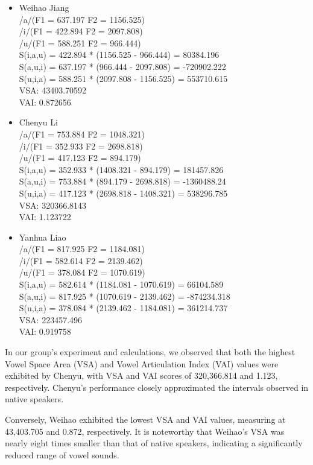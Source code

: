 \documentclass{../labbook}
\begin{document}
\begin{solution}
\begin{itemize}
\item Weihao Jiang\\
/a/(F1 = 637.197 F2 = 1156.525)\\
/i/(F1 = 422.894 F2 = 2097.808)\\
/u/(F1 = 588.251 F2 = 966.444)\\
S(i,a,u) = 422.894 * (1156.525 - 966.444) = 80384.196\\
S(a,u,i) = 637.197 * (966.444 - 2097.808) = -720902.222\\
S(u,i,a) = 588.251 * (2097.808 - 1156.525) = 553710.615\\
VSA: 43403.70592\\
VAI: 0.872656
\item Chenyu Li\\
/a/(F1 = 753.884 F2 = 1048.321)\\
/i/(F1 = 352.933 F2 = 2698.818)\\
/u/(F1 = 417.123 F2 = 894.179)\\
S(i,a,u) = 352.933 * (1408.321 - 894.179) = 181457.826\\
S(a,u,i) = 753.884 * (894.179 - 2698.818) = -1360488.24\\
S(u,i,a) = 417.123 * (2698.818 - 1408.321) = 538296.785\\
VSA: 320366.8143\\
VAI: 1.123722
\item Yanhua Liao\\
/a/(F1 = 817.925 F2 = 1184.081)\\
/i/(F1 = 582.614 F2 = 2139.462)\\
/u/(F1 = 378.084 F2 = 1070.619)\\
S(i,a,u) = 582.614 * (1184.081 - 1070.619) = 66104.589\\
S(a,u,i) = 817.925 * (1070.619 - 2139.462) = -874234.318\\
S(u,i,a) = 378.084 * (2139.462 - 1184.081) = 361214.737\\
VSA: 223457.496\\
VAI: 0.919758
\end{itemize}


In our group's experiment and calculations, we observed that both the highest Vowel Space Area (VSA) and Vowel Articulation Index (VAI) values were exhibited by Chenyu, with VSA and VAI scores of 320,366.814 and 1.123, respectively. Chenyu's performance closely approximated the intervals observed in native speakers.

Conversely, Weihao exhibited the lowest VSA and VAI values, measuring at 43,403.705 and 0.872, respectively. It is noteworthy that Weihao's VSA was nearly eight times smaller than that of native speakers, indicating a significantly reduced range of vowel sounds.


\end{solution}
\end{document}
